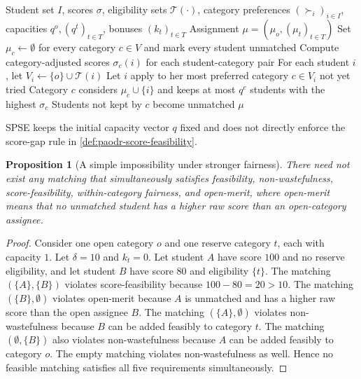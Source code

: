 \documentclass[10pt]{article}
\newtheorem{proposition}{Proposition}
\newcommand{\T}{\mathcal{T}}
\begin{document}
\begin{algorithm}[H]
\caption{Student-Proposing Score-Elevated Mechanism (SPSE)}
\label{alg:spse-short}
\small
\begin{algorithmic}[1]
\Require Student set $I$, scores $\sigma$, eligibility sets $\T(\cdot)$, category preferences $(\succ_i)_{i\in I}$, capacities $q^o,(q^t)_{t\in T}$, bonuses $(k_t)_{t\in T}$
\Ensure Assignment $\mu=(\mu_o,(\mu_t)_{t\in T})$
\State Set $\mu_c\gets\emptyset$ for every category $c\in V$ and mark every student unmatched
\State Compute category-adjusted scores $\sigma_c(i)$ for each student-category pair
\State For each student $i$, let $V_i\gets\{o\}\cup\T(i)$
    \State Let $i$ apply to her most preferred category $c\in V_i$ not yet tried
    \State Category $c$ considers $\mu_c\cup\{i\}$ and keeps at most $q^c$ students with the highest $\sigma_c$
    \State Students not kept by $c$ become unmatched
\EndWhile
\State \Return $\mu$
\end{algorithmic}
\end{algorithm}

SPSE keeps the initial capacity vector $q$ fixed and does not directly enforce the score-gap rule in \cref{def:paodr-score-feasibility}.

\begin{proposition}[A simple impossibility under stronger fairness]
\label{prop:simple-impossibility-short}
There need not exist any matching that simultaneously satisfies feasibility, non-wastefulness, score-feasibility, within-category fairness, and open-merit, where open-merit means that no unmatched student has a higher raw score than an open-category assignee.
\end{proposition}

\begin{proof}
Consider one open category $o$ and one reserve category $t$, each with capacity $1$. Let $\delta=10$ and $k_t=0$. Let student $A$ have score $100$ and no reserve eligibility, and let student $B$ have score $80$ and eligibility $\{t\}$. The matching $(\{A\},\{B\})$ violates score-feasibility because $100-80=20>10$. The matching $(\{B\},\emptyset)$ violates open-merit because $A$ is unmatched and has a higher raw score than the open assignee $B$. The matching $(\{A\},\emptyset)$ violates non-wastefulness because $B$ can be added feasibly to category $t$. The matching $(\emptyset,\{B\})$ also violates non-wastefulness because $A$ can be added feasibly to category $o$. The empty matching violates non-wastefulness as well. Hence no feasible matching satisfies all five requirements simultaneously.
\end{proof}
\end{document}
